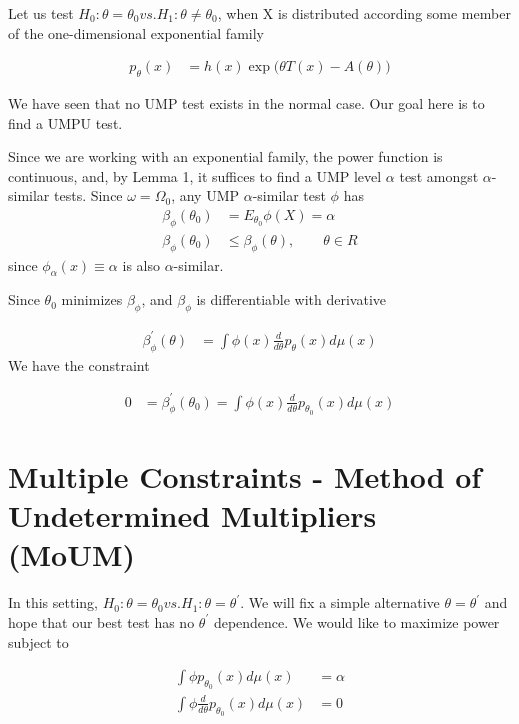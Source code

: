 Let us test $H_0: \theta = \theta_0 vs. H_1 : \theta \neq \theta_0$, when X is distributed according some member of the one-dimensional exponential family

\begin{align*}
	p_{\theta}(x) &= h(x) \exp \Big( \theta T(x) - A(\theta) \Big)
\end{align*}

We have seen that no UMP test exists in the normal case. Our goal here is to find a UMPU test.

Since we are working with an exponential family, the power function is continuous, and, by Lemma 1, it suffices to find a UMP level $\alpha$ test amongst $\alpha$-similar tests.
Since $\omega = \Omega_0$, any UMP $\alpha$-similar test $\phi$ has
\begin{align*}
	\beta_{\phi}(\theta_0) &= E_{\theta_0} \phi(X) = \alpha \\
	\beta_{\phi}(\theta_0) & \leq \beta_{\phi}(\theta), \qquad \theta \in R
\end{align*}
since $\phi_{\alpha} (x) \equiv \alpha$ is also $\alpha$-similar.

Since $\theta_0$ minimizes $\beta_{\phi}$, and $\beta_{\phi}$ is differentiable with derivative 

\begin{align*}
	\beta_{\phi}^{'}(\theta) &= \int \phi(x) \frac{d}{d \theta} p_{\theta} (x) d\mu(x) 
\end{align*}
We have the constraint 

\begin{align*}
	0 &= \beta^{'}_{\phi} (\theta_0) = \int \phi(x) \frac{d}{d \theta} p_{\theta_0}(x) d \mu(x)
\end{align*}	


\section{Multiple Constraints - Method of Undetermined Multipliers (MoUM)}

In this setting, $H_0: \theta = \theta_0 vs. H_1 : \theta = \theta^{'}$. We will fix a simple alternative $\theta = \theta^{'}$ and hope that our best test has no $\theta^{'}$ dependence. We would like to maximize power subject to

\begin{align*}
	\int \phi p_{\theta_0}(x)  d \mu(x) &= \alpha \\
	\int \phi \frac{d}{d\theta} p_{\theta_0}(x)  d \mu(x) &= 0
\end{align*}

